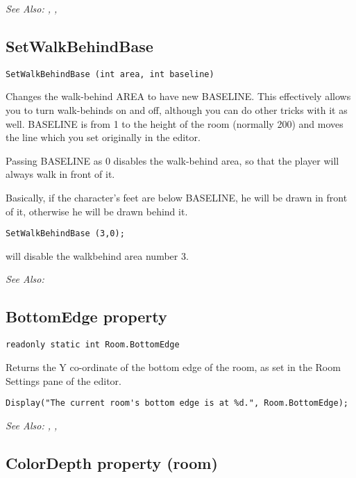 \it{See Also:} , , 


\subsection{SetWalkBehindBase}\label{SetWalkBehindBase}%

\begin{verbatim}
SetWalkBehindBase (int area, int baseline)
\end{verbatim}
Changes the walk-behind AREA to have new BASELINE. This effectively allows
you to turn walk-behinds on and off, although you can do other tricks with
it as well. BASELINE is from 1 to the height of the room (normally 200) and
moves the line which you set originally in the editor.

Passing BASELINE as 0 disables the walk-behind area, so that the player
will always walk in front of it.

Basically, if the character's feet are below BASELINE, he will be drawn in
front of it, otherwise he will be drawn behind it.

\begin{verbatim}
SetWalkBehindBase (3,0);
\end{verbatim}
will disable the walkbehind area number 3.

\it{See Also:} 


\subsection{BottomEdge property}\label{Room.BottomEdge}%

\begin{verbatim}
readonly static int Room.BottomEdge
\end{verbatim}
Returns the Y co-ordinate of the bottom edge of the room, as set in the Room Settings
pane of the editor.

\begin{verbatim}
Display("The current room's bottom edge is at %d.", Room.BottomEdge);
\end{verbatim}

\it{See Also:} , ,


\subsection{ColorDepth property (room)}\label{Room.ColorDepth}%

